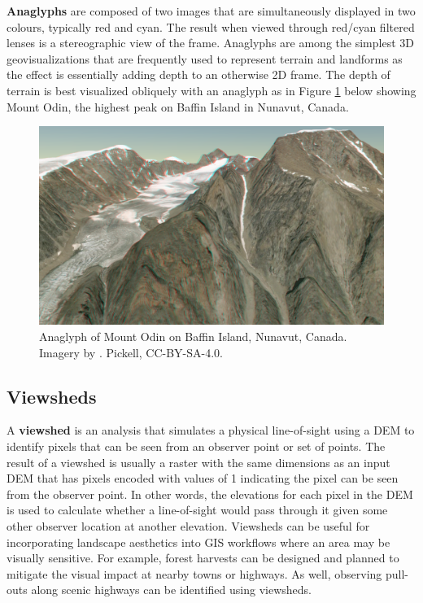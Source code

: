 \documentclass[
]{book}
\begin{document}
\textbf{Anaglyphs} are composed of two images that are simultaneously displayed in two colours, typically red and cyan. The result when viewed through red/cyan filtered lenses is a stereographic view of the frame. Anaglyphs are among the simplest 3D geovisualizations that are frequently used to represent terrain and landforms as the effect is essentially adding depth to an otherwise 2D frame. The depth of terrain is best visualized obliquely with an anaglyph as in Figure \ref{fig:9-baffin-island-mount-odin-1} below showing Mount Odin, the highest peak on Baffin Island in Nunavut, Canada.



\begin{figure}
\includegraphics[width=0.75\linewidth]{images/09-baffin-island-mount-odin-1} \caption{Anaglyph of Mount Odin on Baffin Island, Nunavut, Canada. Imagery by \citep{maxar_precision3d_nodate}. Pickell, CC-BY-SA-4.0.}\label{fig:9-baffin-island-mount-odin-1}
\end{figure}

\subsection{Viewsheds}\label{viewsheds}

A \textbf{viewshed} is an analysis that simulates a physical line-of-sight using a DEM to identify pixels that can be seen from an observer point or set of points. The result of a viewshed is usually a raster with the same dimensions as an input DEM that has pixels encoded with values of 1 indicating the pixel can be seen from the observer point. In other words, the elevations for each pixel in the DEM is used to calculate whether a line-of-sight would pass through it given some other observer location at another elevation. Viewsheds can be useful for incorporating landscape aesthetics into GIS workflows where an area may be visually sensitive. For example, forest harvests can be designed and planned to mitigate the visual impact at nearby towns or highways. As well, observing pull-outs along scenic highways can be identified using viewsheds.
\end{document}
